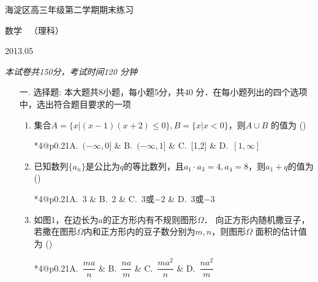 \documentclass[a4paper]{ctexart}%
\makeatletter
\newcommand{\fourch}[4]{(\qquad)\\
\begin{tabular}{*{4}{@{}p{0.21\textwidth}}}A.~#1 & B.~#2 & C.~#3 & D.~#4\end{tabular}}
\makeatother
\begin{document}
\begin{center}
 {\Heiti {} 海淀区高三年级第二学期期末练习}\par {\Heiti {} 数\qquad 学 \ （理科）}\par \hfill 2013.05
\end{center}
\begin{center}\emph{本试卷共\emph{150}分，考试时间\emph{120} 分钟}\end{center}


\begin{itemize}
\item[\Heiti 一.] {\Heiti 选择题: 本大题共8小题，每小题5分，共40 分．在每小题列出的四个选项中，选出符合题目要求的一项}


\begin{enumerate}[leftmargin=*]

\item 集合$A=\{x|(x-1)(x+2)\le 0\},B=\{x|x<0\}$，则$A\cup B$ 的值为
  \fourch{$(-\infty,0]$}{$(-\infty,1]$}{[1,2]}{$[1,\infty]$}

\item 已知数列$\{a_n\}$是公比为$q$的等比数列，且$a_1\cdot a_3=4,a_4=8$，则$a_1+q$的值为
  \fourch{3} {2} {3或$-2$} {3或$-3$}

\item  如图1，在边长为$a$的正方形内有不规则图形$\Omega$． 向正方形内随机撒豆子，若撒在图形$\Omega$内和正方形内的豆子数分别为$m,n$，则图形$\Omega$ 面积的估计值为
  \fourch{$\dfrac {ma}n$}{$\dfrac {na}m$}{$\dfrac {ma^2}n$}{$\dfrac {na^2}m$}


\end{enumerate}
\end{itemize}
\end{document}
